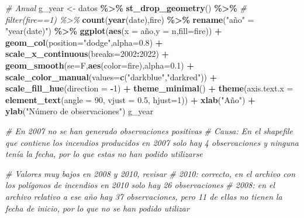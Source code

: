 \documentclass[12pt,a4paper,]{book}
\newenvironment{Shaded}{\begin{snugshade}}{\end{snugshade}}
\newcommand{\AttributeTok}[1]{\textcolor[rgb]{0.13,0.29,0.53}{#1}}
\newcommand{\CommentTok}[1]{\textcolor[rgb]{0.56,0.35,0.01}{\textit{#1}}}
\newcommand{\DecValTok}[1]{\textcolor[rgb]{0.00,0.00,0.81}{#1}}
\newcommand{\FloatTok}[1]{\textcolor[rgb]{0.00,0.00,0.81}{#1}}
\newcommand{\FunctionTok}[1]{\textcolor[rgb]{0.13,0.29,0.53}{\textbf{#1}}}
\newcommand{\NormalTok}[1]{#1}
\newcommand{\OtherTok}[1]{\textcolor[rgb]{0.56,0.35,0.01}{#1}}
\newcommand{\SpecialCharTok}[1]{\textcolor[rgb]{0.81,0.36,0.00}{\textbf{#1}}}
\newcommand{\StringTok}[1]{\textcolor[rgb]{0.31,0.60,0.02}{#1}}
\numberwithin{dummy}{section}
\theoremstyle{ocrenumbox}
\theoremstyle{blacknumex}
\theoremstyle{blacknumbox}
\theoremstyle{ocrenum}
\theoremstyle{ocrenum}
\begin{document}
\begin{Shaded}
\begin{Highlighting}[]
\CommentTok{\# Anual}
\NormalTok{g\_year }\OtherTok{\textless{}{-}}\NormalTok{ datos }\SpecialCharTok{\%\textgreater{}\%} 
  \FunctionTok{st\_drop\_geometry}\NormalTok{() }\SpecialCharTok{\%\textgreater{}\%} 
  \CommentTok{\# filter(fire==1) \%\textgreater{}\% }
  \FunctionTok{count}\NormalTok{(}\FunctionTok{year}\NormalTok{(date),fire) }\SpecialCharTok{\%\textgreater{}\%} 
  \FunctionTok{rename}\NormalTok{(}\StringTok{"año"} \OtherTok{=} \StringTok{"year(date)"}\NormalTok{) }\SpecialCharTok{\%\textgreater{}\%} 
  \FunctionTok{ggplot}\NormalTok{(}\FunctionTok{aes}\NormalTok{(}\AttributeTok{x =}\NormalTok{ año,}\AttributeTok{y =}\NormalTok{ n,}\AttributeTok{fill=}\NormalTok{fire)) }\SpecialCharTok{+}
  \FunctionTok{geom\_col}\NormalTok{(}\AttributeTok{position=}\StringTok{"dodge"}\NormalTok{,}\AttributeTok{alpha=}\FloatTok{0.8}\NormalTok{) }\SpecialCharTok{+}
  \FunctionTok{scale\_x\_continuous}\NormalTok{(}\AttributeTok{breaks=}\DecValTok{2002}\SpecialCharTok{:}\DecValTok{2022}\NormalTok{) }\SpecialCharTok{+}
  \FunctionTok{geom\_smooth}\NormalTok{(}\AttributeTok{se=}\NormalTok{F,}\FunctionTok{aes}\NormalTok{(}\AttributeTok{color=}\NormalTok{fire),}\AttributeTok{alpha=}\FloatTok{0.1}\NormalTok{) }\SpecialCharTok{+}
  \FunctionTok{scale\_color\_manual}\NormalTok{(}\AttributeTok{values=}\FunctionTok{c}\NormalTok{(}\StringTok{"darkblue"}\NormalTok{,}\StringTok{"darkred"}\NormalTok{)) }\SpecialCharTok{+} 
  \FunctionTok{scale\_fill\_hue}\NormalTok{(}\AttributeTok{direction =} \SpecialCharTok{{-}}\DecValTok{1}\NormalTok{) }\SpecialCharTok{+}
  \FunctionTok{theme\_minimal}\NormalTok{() }\SpecialCharTok{+}
  \FunctionTok{theme}\NormalTok{(}\AttributeTok{axis.text.x =} \FunctionTok{element\_text}\NormalTok{(}\AttributeTok{angle =} \DecValTok{90}\NormalTok{, }\AttributeTok{vjust =} \FloatTok{0.5}\NormalTok{, }\AttributeTok{hjust=}\DecValTok{1}\NormalTok{)) }\SpecialCharTok{+}
  \FunctionTok{xlab}\NormalTok{(}\StringTok{"Año"}\NormalTok{) }\SpecialCharTok{+}
  \FunctionTok{ylab}\NormalTok{(}\StringTok{"Número de observaciones"}\NormalTok{)}
\NormalTok{g\_year}

\CommentTok{\# En 2007 no se han generado observaciones positivas}
\CommentTok{\# Causa: En el shapefile que contiene los incendios producidos en 2007 solo hay 4 observaciones y ninguna tenía la fecha, por lo que estas no han podido utilizarse}

\CommentTok{\# Valores muy bajos en 2008 y 2010, revisar}
\CommentTok{\# 2010: correcto, en el archivo con los polígonos de incendios en 2010 solo hay 26 observaciones}
\CommentTok{\# 2008: en el archivo relativo a ese año hay 37 observaciones, pero 11 de ellas no tienen la fecha de inicio, por lo que no se han podido utilizar}


\end{Highlighting}
\end{Shaded}
\end{document}
